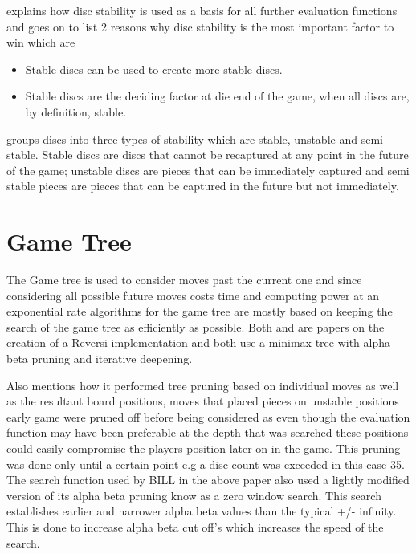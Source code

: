 \documentclass[review]{cmpreport}
\begin{document}
\citet{lee1986bill} explains how disc stability is used as a basis for all further   evaluation functions and goes on to list 2 reasons why disc stability is the most important factor to win which are
\begin{itemize}
	\item Stable discs can be used to create more stable discs.
	\item Stable discs are the deciding factor at die end of the game, when all discs are, by definition, stable.
\end{itemize}
\cite{sannidhanam2015analysis} groups discs into three types of stability which are stable, unstable and semi stable. Stable discs are discs that cannot be recaptured at any point in the future of the game; unstable discs are pieces that can be immediately captured and semi stable pieces are pieces that can be captured in the future but not immediately.





\section{Game Tree}
The Game tree is used to consider moves past the current one and since considering all possible future moves costs time and computing power at an exponential rate algorithms for the game tree are mostly based on keeping the search of the game tree as efficiently as possible. Both \citet{lee1986bill} and \citet{rosenbloom1982world} are papers on the creation of a Reversi implementation and both use a minimax tree with alpha-beta pruning and iterative deepening. 

\cite{lee1986bill} Also mentions how it performed tree pruning based on individual moves as well as the resultant board positions, moves that placed pieces on unstable positions early game were pruned off before being considered as even though the evaluation function may have been preferable at the depth that was searched these positions could easily compromise the players position later on in the game. This pruning was done only until a certain point e.g a disc count was exceeded in this case 35. The search function used by BILL in the above paper also used a lightly modified version of its alpha beta pruning know as a zero window search. This search establishes earlier and narrower alpha beta values than the typical +/- infinity. This is done to increase alpha beta cut off's which increases the speed of the search.
\end{document}
